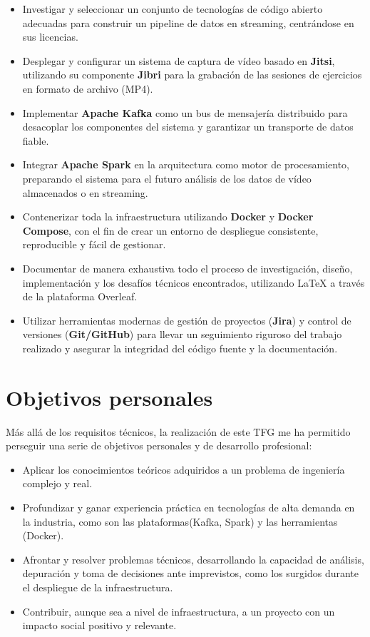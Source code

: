 \begin{itemize}
    \item Investigar y seleccionar un conjunto de tecnologías de código abierto adecuadas para construir un pipeline de datos en streaming, centrándose en sus licencias.
    
    \item Desplegar y configurar un sistema de captura de vídeo basado en \textbf{Jitsi}, utilizando su componente \textbf{Jibri} para la grabación de las sesiones de ejercicios en formato de archivo (MP4).
    
    \item Implementar \textbf{Apache Kafka} como un bus de mensajería distribuido para desacoplar los componentes del sistema y garantizar un transporte de datos fiable.
    
    \item Integrar \textbf{Apache Spark} en la arquitectura como motor de procesamiento, preparando el sistema para el futuro análisis de los datos de vídeo almacenados o en streaming.
    
    \item Contenerizar toda la infraestructura utilizando \textbf{Docker} y \textbf{Docker Compose}, con el fin de crear un entorno de despliegue consistente, reproducible y fácil de gestionar.
    
    \item Documentar de manera exhaustiva todo el proceso de investigación, diseño, implementación y los desafíos técnicos encontrados, utilizando \LaTeX{} a través de la plataforma Overleaf.
    
    \item Utilizar herramientas modernas de gestión de proyectos (\textbf{Jira}) y control de versiones (\textbf{Git/GitHub}) para llevar un seguimiento riguroso del trabajo realizado y asegurar la integridad del código fuente y la documentación.
    
\end{itemize}


\section{Objetivos personales}

Más allá de los requisitos técnicos, la realización de este TFG me ha permitido perseguir una serie de objetivos personales y de desarrollo profesional:

\begin{itemize}
    \item Aplicar los conocimientos teóricos adquiridos a un problema de ingeniería complejo y real.
    \item Profundizar y ganar experiencia práctica en tecnologías de alta demanda en la industria, como son las plataformas(Kafka, Spark) y las herramientas (Docker).
    \item Afrontar y resolver problemas técnicos, desarrollando la capacidad de análisis, depuración y toma de decisiones ante imprevistos, como los surgidos durante el despliegue de la infraestructura.
    \item Contribuir, aunque sea a nivel de infraestructura, a un proyecto con un impacto social positivo y relevante.
\end{itemize}